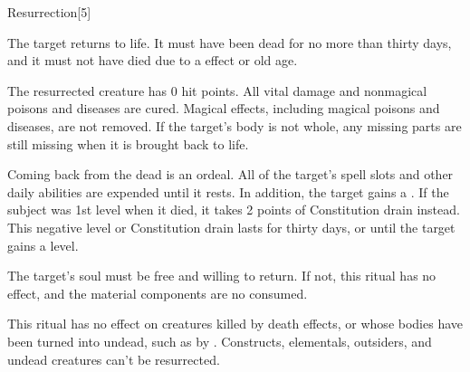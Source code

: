 \begin{spellsection}{Resurrection}[5]
    \begin{spellheader}
    \end{spellheader}
    \begin{spellcontent}
        \begin{spelltargetinginfo}
        \end{spelltargetinginfo}
        \begin{spelleffects}
            \spelleffect The target returns to life. It must have been dead for no more than thirty days, and it must not have died due to a  effect or old age.

            The resurrected creature has 0 hit points. All vital damage and nonmagical poisons and diseases are cured. Magical effects, including magical poisons and diseases, are not removed. If the target's body is not whole, any missing parts are still missing when it is brought back to life.

            \par Coming back from the dead is an ordeal. All of the target's spell slots and other daily abilities are expended until it rests. In addition, the target gains a \negativelevel. If the subject was 1st level when it died, it takes 2 points of Constitution drain instead. This negative level or Constitution drain lasts for thirty days, or until the target gains a level.
        \end{spelleffects}
    \end{spellcontent}
    \begin{spellfooter}
        \spellnotes The target's soul must be free and willing to return. If not, this ritual has no effect, and the material components are no consumed.

        This ritual has no effect on creatures killed by death effects, or whose bodies have been turned into undead, such as by . Constructs, elementals, outsiders, and undead creatures can't be resurrected.
    \end{spellfooter}
    \begin{spellaugments}
    \end{spellaugments}
\end{spellsection}

